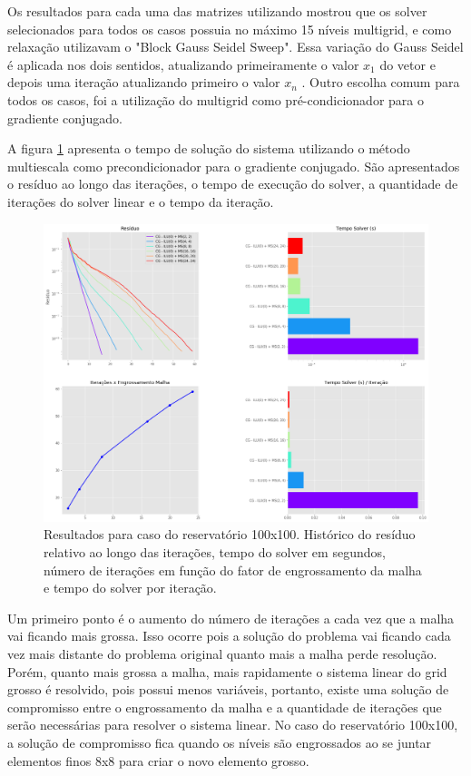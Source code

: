 Os resultados para cada uma das matrizes utilizando mostrou que os solver selecionados para todos os casos possuia no máximo 15 níveis multigrid, e como relaxação utilizavam o "Block Gauss Seidel Sweep". Essa variação do Gauss Seidel é aplicada nos dois sentidos, atualizando primeiramente o valor  $x_1$  do vetor e depois uma iteração atualizando primeiro o valor  $x_n$ . Outro escolha comum para todos os casos, foi a utilização do multigrid como pré-condicionador para o gradiente conjugado.

A figura \ref{fig:reservatorio100x100_1} apresenta o tempo de solução do sistema utilizando o método multiescala como precondicionador para o gradiente conjugado. São apresentados o resíduo ao longo das iterações, o tempo de execução do solver, a quantidade de iterações do solver linear e o tempo da iteração.


\begin{figure}[!htbp]
\label{fig:reservatorio100x100_1}
\centering
\includegraphics[width=\textwidth]{chap08/figs/reservatorio100x100_1.png}
\caption{Resultados para caso do reservatório 100x100. Histórico do resíduo relativo ao longo das iterações, tempo do solver em segundos, número de iterações em função do fator de engrossamento da malha e tempo do solver por iteração. }
\end{figure}

Um primeiro ponto é o aumento do número de iterações a cada vez que a malha vai ficando mais grossa. Isso ocorre pois a solução do problema vai ficando cada vez mais distante do problema original quanto mais a malha perde resolução. Porém, quanto mais grossa a malha, mais rapidamente o sistema linear do grid grosso é resolvido, pois possui menos variáveis, portanto,  existe uma solução de compromisso entre o engrossamento da malha e a quantidade de iterações que serão necessárias para resolver o sistema linear. No caso do reservatório 100x100, a solução de compromisso fica quando os níveis são engrossados ao se juntar elementos finos 8x8 para criar o novo elemento grosso. 

